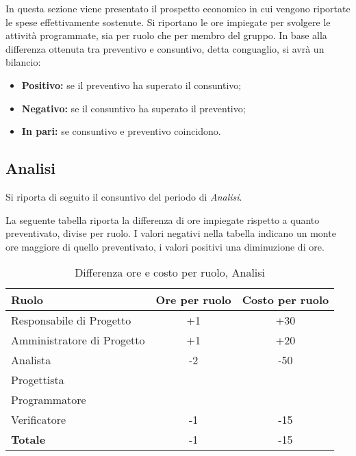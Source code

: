 In questa sezione viene presentato il prospetto economico in cui vengono riportate le spese effettivamente sostenute. Si riportano le ore impiegate per svolgere le attività programmate, sia per ruolo che per membro del gruppo. In base alla differenza ottenuta tra preventivo e consuntivo, detta conguaglio, si avrà un bilancio:
\begin{itemize}
	\item \textbf{Positivo:} se il preventivo ha superato il consuntivo; 
	\item \textbf{Negativo:} se il consuntivo ha superato il preventivo;
	\item \textbf{In pari:} se consuntivo e preventivo coincidono.
\end{itemize}

\subsection{Analisi}
Si riporta di seguito il consuntivo del periodo di \textit{Analisi}.

\noindent La seguente tabella riporta la differenza di ore impiegate rispetto a quanto preventivato, divise per ruolo. I valori negativi nella tabella indicano un monte ore maggiore di quello preventivato, i valori positivi una diminuzione di ore.

\begin{table}[h]
\centering
\begin{tabular}{|l|c|c|}
	\toprule
	\textbf{Ruolo} & \textbf{Ore per ruolo} & \textbf{Costo per ruolo} \\
	
	\midrule
	Responsabile di Progetto & +1 & +30 \\
	Amministratore di Progetto & +1 & +20 \\ 
	Analista & -2 & -50 \\
	Progettista & & \\
	Programmatore & & \\
	Verificatore & -1 & -15 \\
	\midrule
	\textbf{Totale} & -1 & -15 \\
		
	\bottomrule
\end{tabular}
\caption{Differenza ore e costo per ruolo, Analisi}
\label{tab3}
\end{table} 

